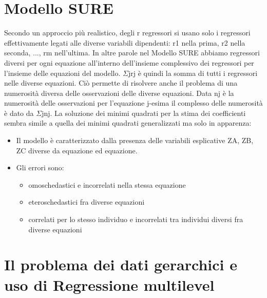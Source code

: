 \documentclass[a4page, 11pt]{article} %
\begin{document}
\section{Modello SURE}

Secondo un approccio più realistico, degli r regressori si usano solo i regressori effettivamente legati alle diverse variabili dipendenti: r1 nella prima, r2 nella seconda, ..., rm nell’ultima.
\newline
In altre parole nel Modello SURE abbiamo regressori diversi per ogni equazione all’interno dell’insieme complessivo dei regressori per l’insieme delle equazioni del modello. 
\newline
$\Sigma$jrj è quindi la somma di tutti i regressori nelle diverse equazioni.
\newline
Ciò permette di risolvere anche il problema di una numerosità diversa delle osservazioni delle diverse equazioni. Data nj è la numerosità delle osservazioni per l’equazione j-esima il complesso delle numerosità è dato da $\Sigma$jnj.
\newline
La soluzione dei minimi quadrati per la stima dei coefficienti sembra simile a quella dei minimi quadrati generalizzati ma solo in apparenza: 
\begin{itemize}
\item Il modello è caratterizzato dalla presenza delle variabili esplicative ZA, ZB, ZC diverse da equazione ed equazione.
\item Gli errori sono:
	\begin{itemize}[noitemsep]
	\item omoschedastici e incorrelati nella stessa equazione
	\item eteroschedastici fra diverse equazioni
	\item correlati per lo stesso individuo e incorrelati tra individui diversi fra diverse equazioni
	\end{itemize}
\end{itemize}

\section{Il problema dei dati gerarchici e uso di Regressione multilevel}
\end{document}
